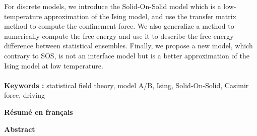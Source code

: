 For discrete models, we introduce the Solid-On-Solid model which is a low-temperature approximation of the Ising model, and use the transfer matrix method to compute the confinement force. We also generalize a method to numerically compute the free energy and use it to describe the free energy difference between statistical ensembles. Finally, we propose a new model, which contrary to SOS, is not an interface model but is a better approximation of the Ising model at low temperature.
\\ \\
{\bf Keywords : }  statistical field theory, model A/B, Ising, Solid-On-Solid, Casimir force, driving

\newpage
{\bf \huge Résumé en français}

\newpage
{\bf \huge Abstract}